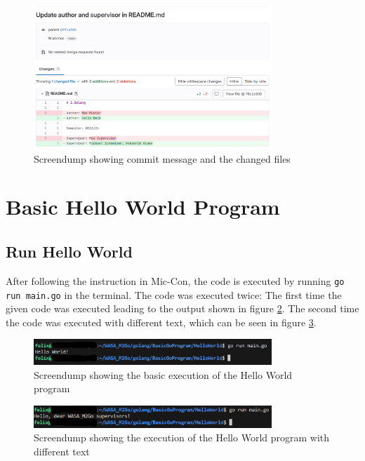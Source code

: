 \begin{figure}[h]
    \centering
    \includegraphics[width=0.8\textwidth]{figures/goLang/golang_screendumpReadmeCommit.png}
    \caption{Screendump showing commit message and the changed files}
    \label{fig:screendump_readmeCommitMessage}
\end{figure}

\section{Basic Hello World Program}
\subsection{Run Hello World}
After following the instruction in Mic-Con, the code is executed by running \texttt{go run main.go} in the terminal.
The code was executed twice: The first time the given code was executed leading to the output shown in figure \ref{fig:screendump_helloWorld_basicExecution}.
The second time the code was executed with different text, which can be seen in figure \ref{fig:screendump_helloWorld_differentText}.

\begin{figure} [h]
    \centering
    \includegraphics[width=0.8\textwidth]{figures/goLang/helloWorld/golang_helloWorld_basicExecution.png}
    \caption{Screendump showing the basic execution of the Hello World program}
    \label{fig:screendump_helloWorld_basicExecution}
\end{figure}

\begin{figure}[h]
    \centering
    \includegraphics[width=0.8\textwidth]{figures/goLang/helloWorld/golang_helloWorld_ExecutionDifferentText.png}
    \caption{Screendump showing the execution of the Hello World program with different text}
    \label{fig:screendump_helloWorld_differentText}
\end{figure}

